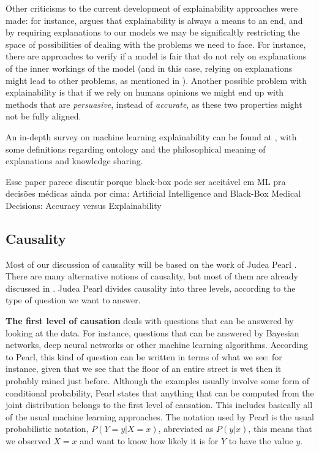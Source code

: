 Other criticisms to the current development of explainability approaches were made: for instance, \cite{Against Interpretability: a Critical Examination of the Interpretability Problem in Machine Learning} argues that explainability is always a means to an end, and by requiring explanations to our models we may be significaltly restricting the space of possibilities of dealing with the problems we need to face. For instance, there are approaches to verify if a model is fair that do not rely on explanations of the inner workings of the model (and in this case, relying on explanations might lead to other problems, as mentioned in \cite{How to explain and justify almost any decision}). Another possible problem with explainability is that if we rely on humans opinions we might end up with methods that are \textit{persuasive}, instead of \textit{accurate}, as these two properties might not be fully aligned. 

An in-depth survey on machine learning explainability can be found at \cite{A Survey on the Explainability of Supervised Machine Learning}, with some definitions regarding ontology and the philosophical meaning of explanations and knowledge sharing. 

{\color{red} Esse paper parece discutir porque black-box pode ser aceitável em ML pra decisões médicas ainda por cima: Artificial Intelligence and Black-Box Medical Decisions: Accuracy versus Explainability}

\subsection{Causality}

Most of our discussion of causality will be based on the work of Judea Pearl \cite{Causality}. There are many alternative notions of causality, but most of them are already discussed in \cite{Causality}. Judea Pearl divides causality into three levels, according to the type of question we want to answer. 

\textbf{The first level of causation} deals with questions that can be answered by looking at the data. For instance, questions that can be answered by Bayesian networks, deep neural networks or other machine learning algorithms. According to Pearl, this kind of question can be written in terms of what we see: for instance, given that we see that the floor of an entire street is wet then it probably rained just before. Although the examples usually involve some form of conditional probability, Pearl states that anything that can be computed from the joint distribution belongs to the first level of causation. This includes basically all of the usual machine learning approaches. The notation used by Pearl is the usual probabilistic notation, $P(Y=y|X=x)$, abreviated as $P(y|x)$, this means that we observed $X=x$ and want to know how likely it is for $Y$ to have the value $y$.

